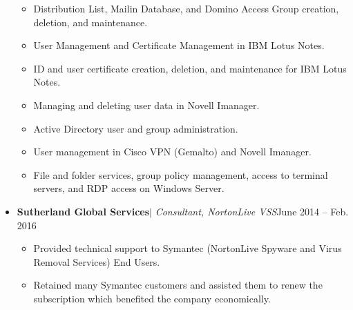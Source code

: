 \documentclass[letterpaper, 12pt]{article}
\begin{document}
\begin{minipage}{0.5\textwidth}
\begin{itemize}[noitemsep]
						\vspace*{-0.6cm}
						\begin{itemize}[noitemsep]
							\item{Distribution List, Mailin Database, and Domino Access Group creation, deletion, and maintenance.}
							\item {User Management and Certificate Management in IBM Lotus Notes.}
							\item {ID and user certificate creation, deletion, and maintenance for IBM Lotus Notes.}
							\item {Managing and deleting user data in Novell Imanager.}
							\item {Active Directory user and group administration.}
							\item {User management in Cisco VPN (Gemalto) and Novell Imanager.}
							\item {File and folder services, group policy management, access to terminal servers, and RDP access on Windows Server.}	
						\end{itemize}
						\vspace*{-0.1cm}
						\item {\textbf{Sutherland Global Services}$|$ \textit{Consultant, NortonLive VSS}\hfill{June 2014 -- Feb. 2016}}\\
						\vspace*{-0.6cm}
						\begin{itemize}[noitemsep]
							\item {Provided technical support to Symantec (NortonLive Spyware and Virus Removal Services) End Users.}
							\item {Retained many Symantec customers and assisted them to renew the subscription which benefited the company economically.}
							
						\end{itemize}
					\end{itemize}  
			\end{minipage}\hfil
\end{document}
